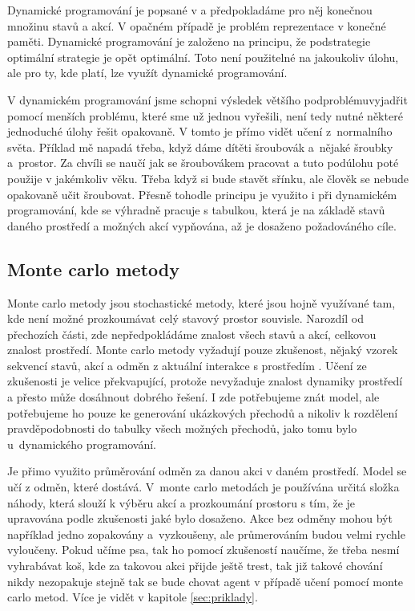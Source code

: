 \documentclass{article}
\begin{document}
Dynamické programování je popsané v \cite{sutton1998introduction} a předpokladáme pro něj konečnou množinu stavů a akcí. V opačném případě je problém reprezentace v konečné paměti. Dynamické programování je založeno na principu, že podstrategie optimální strategie je opět optimální. Toto není použitelné na jakoukoliv úlohu, ale pro ty, kde platí, lze využít dynamické programování. 

V dynamickém programování jsme schopni výsledek většího podproblémuvyjadřit pomocí menších problému, které sme už jednou vyřešili, není tedy nutné některé jednoduché úlohy řešit opakovaně. V tomto je přímo vidět učení z~normalního světa. Příklad mě napadá třeba, když dáme dítěti šroubovák a~nějaké šroubky a~prostor. Za chvíli se naučí jak se šroubovákem pracovat a tuto podúlohu poté použije v jakémkoliv věku. Třeba když si bude stavět sřínku, ale člověk se nebude opakovaně učit šroubovat. Přesně tohodle principu je využito i při dynamickém programování, kde se výhradně pracuje s tabulkou, která je na základě stavů daného prostředí a možných akcí vypňována, až je dosaženo požadováného cíle.

\subsection{Monte carlo metody}
Monte carlo metody jsou stochastické metody, které jsou hojně využívané tam, kde není možné prozkoumávat celý stavový prostor souvisle. Narozdíl od přechozích části, zde nepředpokládáme znalost všech stavů a akcí, celkovou znalost prostředí. Monte carlo metody vyžadují pouze zkušenost, nějaký vzorek sekvencí stavů, akcí a odměn z aktuální interakce s prostředím \cite{sutton1998introduction}. Učení ze zkušenosti je velice překvapující, protože nevyžaduje znalost dynamiky prostředí a přesto může dosáhnout dobrého řešení. I zde potřebujeme znát model, ale potřebujeme ho pouze ke generování ukázkových přechodů a nikoliv k rozdělení pravděpodobnosti do tabulky všech možných přechodů, jako tomu bylo u~dynamického programování. 

Je přimo využito průměrování odměn za danou akci v daném prostředí. Model se učí z odměn, které dostává. V~monte carlo metodách je používána určitá složka náhody, která slouží k výběru akcí a prozkoumání prostoru s tím, že je upravována podle zkušenosti jaké bylo dosaženo. Akce bez odměny mohou být například jedno zopakovány a~vyzkoušeny, ale průmerováním budou velmi rychle vyloučeny. Pokud učíme psa, tak ho pomocí zkušeností naučíme, že třeba nesmí vyhrabávat koš, kde za takovou akci přijde ještě trest, tak již takové chování nikdy nezopakuje stejně tak se bude chovat agent v případě učení pomocí monte carlo metod. Více je vidět v kapitole \ref{sec:priklady}. 
\end{document}
